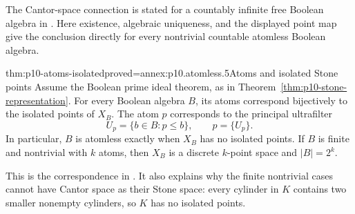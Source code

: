 The Cantor-space connection is stated for a countably infinite free Boolean
algebra in \cite[Chapter~IV, \S4, Exercise~3, p.~140]{BurrisSankappanavar2012}.
Here existence, algebraic uniqueness, and the displayed point map
give the conclusion directly for every nontrivial countable
atomless Boolean algebra.

\begin{hbtheorem}{thm:p10-atoms-isolated}{proved=annex:p10.atomless.5}{Atoms and isolated Stone points}
Assume the Boolean prime ideal theorem, as in
Theorem~\ref{thm:p10-stone-representation}.
For every Boolean algebra \(B\), its atoms correspond bijectively
to the isolated points of \(X_B\).
The atom \(p\) corresponds to the principal ultrafilter
\[
 U_p=\{b\in B:p\leq b\},\qquad \widehat p=\{U_p\}.
\]
In particular, \(B\) is atomless exactly when \(X_B\) has no
isolated points.  If \(B\) is finite and nontrivial with \(k\)
atoms, then \(X_B\) is a discrete \(k\)-point space and
\(|B|=2^k\).
\end{hbtheorem}

This is the correspondence in
\cite[Chapter~IV, \S4, Exercise~11, p.~141]{BurrisSankappanavar2012}.
It also explains why the finite nontrivial cases cannot have
Cantor space as their Stone space: every cylinder in \(K\)
contains two smaller nonempty cylinders, so \(K\) has no isolated
points.
